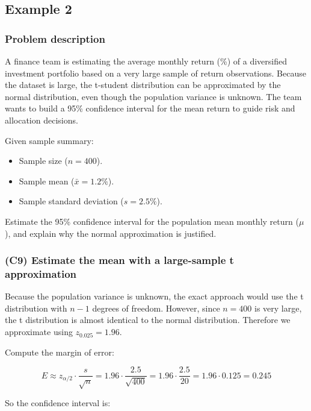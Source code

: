 \subsection{Example 2}\label{sec:interval-example2}

\subsubsection{Problem description}\label{subsec:interval-example2-problem}

A finance team is estimating the average monthly return (\%) of a diversified investment portfolio based on a very large sample of return observations. Because the dataset is large, the t-student distribution can be approximated by the normal distribution, even though the population variance is unknown. The team wants to build a 95\% confidence interval for the mean return to guide risk and allocation decisions.

Given sample summary:

\begin{itemize}
	\item Sample size (\(n = 400\)).
	\item Sample mean (\(\bar{x} = 1.2\%\)).
	\item Sample standard deviation (\(s = 2.5\%\)).
\end{itemize}

Estimate the 95\% confidence interval for the population mean monthly return (\(\mu\)), and explain why the normal approximation is justified.


\subsubsection{(C9) Estimate the mean with a large-sample t approximation}\label{subsubsec:interval-example2-c9}

Because the population variance is unknown, the exact approach would use the t distribution with \(n - 1\) degrees of freedom. However, since \(n = 400\) is very large, the t distribution is almost identical to the normal distribution. Therefore we approximate using \(z_{0.025} = 1.96\).

Compute the margin of error:

\[
E \approx z_{\alpha/2} \cdot \frac{s}{\sqrt{n}}
= 1.96 \cdot \frac{2.5}{\sqrt{400}}
= 1.96 \cdot \frac{2.5}{20}
= 1.96 \cdot 0.125
= 0.245
\]

So the confidence interval is:

